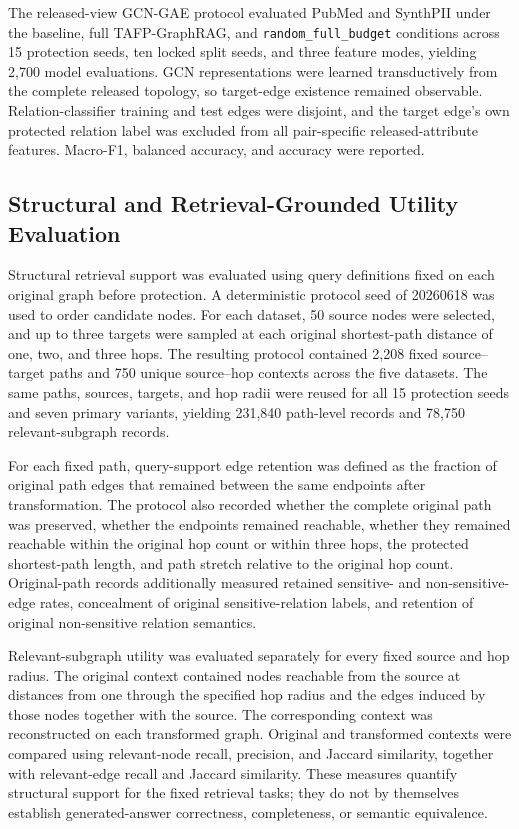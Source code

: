 \documentclass[preprint,12pt]{elsarticle}
\begin{document}
The released-view GCN-GAE protocol evaluated PubMed and SynthPII under the baseline, full TAFP-GraphRAG, and \nolinkurl{random_full_budget} conditions across 15 protection seeds, ten locked split seeds, and three feature modes, yielding 2,700 model evaluations. GCN representations were learned transductively from the complete released topology, so target-edge existence remained observable. Relation-classifier training and test edges were disjoint, and the target edge's own protected relation label was excluded from all pair-specific released-attribute features. Macro-F1, balanced accuracy, and accuracy were reported.

\subsection{Structural and Retrieval-Grounded Utility Evaluation}
Structural retrieval support was evaluated using query definitions fixed on each original graph before protection. A deterministic protocol seed of 20260618 was used to order candidate nodes. For each dataset, 50 source nodes were selected, and up to three targets were sampled at each original shortest-path distance of one, two, and three hops. The resulting protocol contained 2,208 fixed source--target paths and 750 unique source--hop contexts across the five datasets. The same paths, sources, targets, and hop radii were reused for all 15 protection seeds and seven primary variants, yielding 231,840 path-level records and 78,750 relevant-subgraph records.

For each fixed path, query-support edge retention was defined as the fraction of original path edges that remained between the same endpoints after transformation. The protocol also recorded whether the complete original path was preserved, whether the endpoints remained reachable, whether they remained reachable within the original hop count or within three hops, the protected shortest-path length, and path stretch relative to the original hop count. Original-path records additionally measured retained sensitive- and non-sensitive-edge rates, concealment of original sensitive-relation labels, and retention of original non-sensitive relation semantics.

Relevant-subgraph utility was evaluated separately for every fixed source and hop radius. The original context contained nodes reachable from the source at distances from one through the specified hop radius and the edges induced by those nodes together with the source. The corresponding context was reconstructed on each transformed graph. Original and transformed contexts were compared using relevant-node recall, precision, and Jaccard similarity, together with relevant-edge recall and Jaccard similarity. These measures quantify structural support for the fixed retrieval tasks; they do not by themselves establish generated-answer correctness, completeness, or semantic equivalence.
\end{document}

